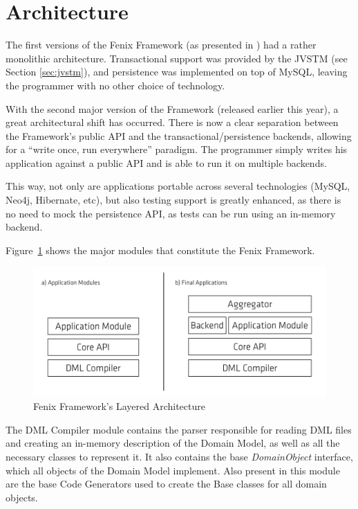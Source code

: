 \section{Architecture}
\label{sec:ff-arch}

The first versions of the Fenix Framework (as presented in
\cite{fernandes2011strict}) had a rather monolithic
architecture. Transactional support was provided by the JVSTM (see
Section \ref{sec:jvstm}), and persistence was implemented on top of
MySQL, leaving the programmer with no other choice of technology.

With the second major version of the Framework (released earlier this
year), a great architectural shift has occurred. There is now a clear
separation between the Framework's public API and the
transactional/persistence backends, allowing for a ``write once, run
everywhere'' paradigm. The programmer simply writes his application
against a public API and is able to run it on multiple backends.

This way, not only are applications portable across several
technologies (MySQL, Neo4j, Hibernate, etc), but also testing support is
greatly enhanced, as there is no need to mock the persistence API, as
tests can be run using an in-memory backend.

Figure~\ref{fig:ff-arch} shows the major modules that constitute the Fenix
Framework.

\begin{figure}
\centering
\includegraphics[width=0.8\linewidth]{ff-arch}
\caption{Fenix Framework's Layered Architecture}
\label{fig:ff-arch}
\end{figure}

The DML Compiler module contains the parser responsible for reading
DML files and creating an in-memory description of the Domain Model,
as well as all the necessary classes to represent it. It also contains
the base {\it DomainObject} interface, which all objects of the Domain
Model implement. Also present in this module are the base Code
Generators used to create the Base classes for all domain
objects.

